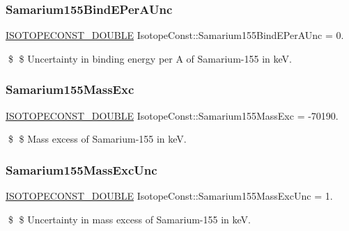 \subsubsection{\texorpdfstring{Samarium155\+Bind\+E\+Per\+A\+Unc}{Samarium155BindEPerAUnc}}
{\footnotesize\ttfamily \mbox{\hyperlink{group___isotope_const-_macros_ga8f45a7272ce02c0b4c65c44636ed719a}{I\+S\+O\+T\+O\+P\+E\+C\+O\+N\+S\+T\+\_\+\+D\+O\+U\+B\+LE}} Isotope\+Const\+::\+Samarium155\+Bind\+E\+Per\+A\+Unc = 0.}

\$ \$ Uncertainty in binding energy per A of Samarium-\/155 in keV. \mbox{\label{group___isotope_const-_samarium-_sm155_gabc3286dfbfc9b640ab8744cee5564422}} 
\subsubsection{\texorpdfstring{Samarium155\+Mass\+Exc}{Samarium155MassExc}}
{\footnotesize\ttfamily \mbox{\hyperlink{group___isotope_const-_macros_ga8f45a7272ce02c0b4c65c44636ed719a}{I\+S\+O\+T\+O\+P\+E\+C\+O\+N\+S\+T\+\_\+\+D\+O\+U\+B\+LE}} Isotope\+Const\+::\+Samarium155\+Mass\+Exc = -\/70190.}

\$ \$ Mass excess of Samarium-\/155 in keV. \mbox{\label{group___isotope_const-_samarium-_sm155_ga85fa26ddfd35eeea4f23ac5cbfcf7dcb}} 
\subsubsection{\texorpdfstring{Samarium155\+Mass\+Exc\+Unc}{Samarium155MassExcUnc}}
{\footnotesize\ttfamily \mbox{\hyperlink{group___isotope_const-_macros_ga8f45a7272ce02c0b4c65c44636ed719a}{I\+S\+O\+T\+O\+P\+E\+C\+O\+N\+S\+T\+\_\+\+D\+O\+U\+B\+LE}} Isotope\+Const\+::\+Samarium155\+Mass\+Exc\+Unc = 1.}

\$ \$ Uncertainty in mass excess of Samarium-\/155 in keV. \mbox{\label{group___isotope_const-_samarium-_sm155_ga62f5e4f663f12306f7d935f2a7c80586}} 
